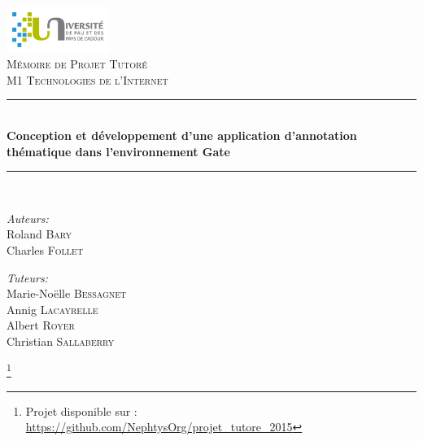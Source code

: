 \documentclass[a4paper, 11pt]{report}
\newcommand{\HRule}{\rule{\linewidth}{0.5mm}}
\begin{document}
\author{Charles Follet \and Roland Bary}

\begin{titlepage}
\begin{center}

\includegraphics[width=0.25\textwidth]{./logo.png}~\\[1cm]

\textsc{\Large Mémoire de Projet Tutoré}\\[0.5cm]
\textsc{\Large M1 Technologies de l'Internet}\\[0.5cm]

\HRule \\[0.4cm]
{ \LARGE \bfseries Conception et développement d’une application d’annotation thématique dans
l'environnement Gate \\[0.4cm] }

\HRule \\[1.5cm]

\noindent
\begin{minipage}[t]{0.4\textwidth}
\begin{flushleft} \large
\emph{Auteurs:}\\
Roland \textsc{Bary}\\
Charles \textsc{Follet}\\

\end{flushleft}
\end{minipage}%
\begin{minipage}[t]{0.4\textwidth}
\begin{flushright} \large
\emph{Tuteurs:} \\
Marie-Noëlle \textsc{Bessagnet}\\
Annig \textsc{Lacayrelle}\\
Albert \textsc{Royer}\\
Christian \textsc{Sallaberry}
\end{flushright}
\end{minipage}
\vfill

{\large \date{}}
\footnote{
Projet disponible sur : \url{https://github.com/NephtysOrg/projet_tutore_2015}}
\end{center}
\end{titlepage}
\end{document}
